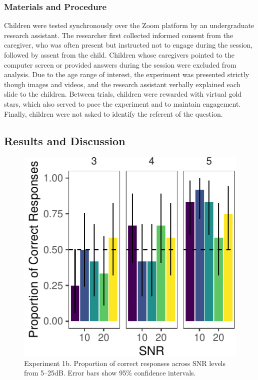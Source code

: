 \documentclass[10pt, letterpaper]{article}
\newenvironment{CodeChunk}{}{}
\begin{document}
\hypertarget{materials-and-procedure-1}{%
\subsubsection{Materials and
Procedure}\label{materials-and-procedure-1}}

Children were tested synchronously over the Zoom platform by an
undergraduate research assistant. The researcher first collected
informed consent from the caregiver, who was often present but
instructed not to engage during the session, followed by assent from the
child. Children whose caregivers pointed to the computer screen or
provided answers during the session were excluded from analysis. Due to
the age range of interest, the experiment was presented strictly though
images and videos, and the research assistant verbally explained each
slide to the children. Between trials, children were rewarded with
virtual gold stars, which also served to pace the experiment and to
maintain engagement. Finally, children were not asked to identify the
referent of the question.

\hypertarget{results-and-discussion-1}{%
\subsection{Results and Discussion}\label{results-and-discussion-1}}

\begin{CodeChunk}
\begin{figure}[t]

{\centering \includegraphics{figs/e1b-bar-1} 

}

\caption[Experiment 1b]{Experiment 1b. Proportion of correct responses across SNR levels from 5--25dB. Error bars show 95\% confidence intervals.}\label{fig:e1b-bar}
\end{figure}
\end{CodeChunk}
\end{document}
